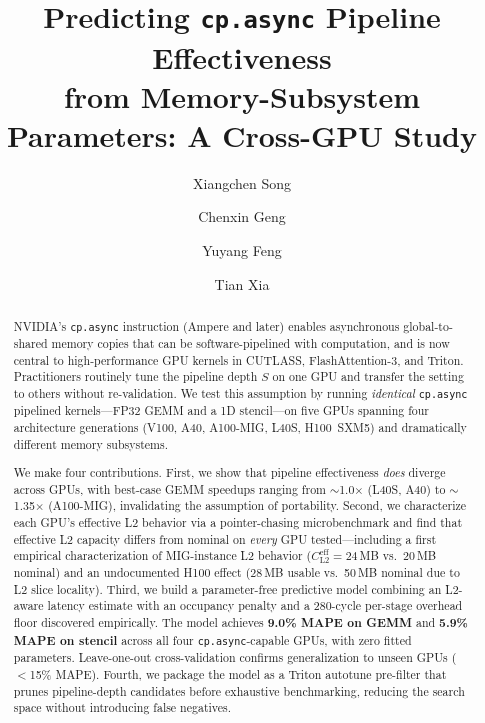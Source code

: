 \documentclass[sigplan,nonacm,10pt]{acmart}
\newcommand{\cpasync}{\texttt{cp.async}}
\newcommand{\highlight}[1]{\colorbox{ummaize!35}{\textbf{#1}}}
\begin{document}
\title{Predicting \cpasync{} Pipeline Effectiveness\\
from Memory-Subsystem Parameters: A Cross-GPU Study}

\author{Xiangchen Song}
\author{Chenxin Geng}
\author{Yuyang Feng}
\author{Tian Xia}

\begin{abstract}
NVIDIA's \cpasync{} instruction (Ampere and later) enables asynchronous
global-to-shared memory copies that can be software-pipelined with
computation, and is now central to high-performance GPU kernels in
CUTLASS, FlashAttention-3, and Triton.
Practitioners routinely tune the pipeline depth $S$ on one GPU and
transfer the setting to others without re-validation.
We test this assumption by running \emph{identical} \cpasync{} pipelined
kernels---FP32 GEMM and a 1D stencil---on five GPUs spanning four
architecture generations (V100, A40, A100-MIG, L40S, H100~SXM5) and
dramatically different memory subsystems.

We make four contributions.
First, we show that pipeline effectiveness \emph{does} diverge across
GPUs, with best-case GEMM speedups ranging from $\sim$1.0$\times$
(L40S, A40) to $\sim$1.35$\times$ (A100-MIG), invalidating the
assumption of portability.
Second, we characterize each GPU's effective L2 behavior via a
pointer-chasing microbenchmark and find that effective L2 capacity
differs from nominal on \emph{every} GPU tested---including a first
empirical characterization of MIG-instance L2 behavior
($C_{\text{L2}}^{\text{eff}} = 24$\,MB vs.\ 20\,MB nominal) and an
undocumented H100 effect ($28$\,MB usable vs.\ 50\,MB nominal due to L2
slice locality).
Third, we build a parameter-free predictive model combining an
L2-aware latency estimate with an occupancy penalty and a 280-cycle
per-stage overhead floor discovered empirically.
The model achieves \highlight{9.0\% MAPE on GEMM} and
\highlight{5.9\% MAPE on stencil} across all four \cpasync{}-capable
GPUs, with zero fitted parameters.
Leave-one-out cross-validation confirms generalization to unseen GPUs
($<$15\% MAPE).
Fourth, we package the model as a Triton autotune pre-filter that
prunes pipeline-depth candidates before exhaustive benchmarking, reducing
the search space without introducing false negatives.
\end{abstract}
\end{document}

